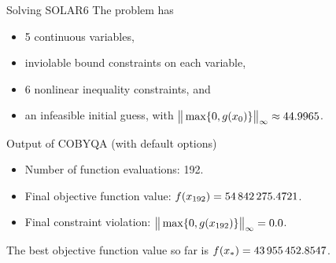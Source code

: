 \documentclass[
]{talk}
\newcommand*{\cub}{g}
\newcommand*{\iter}[1][]{x\ifblank{#1}{}{_{#1}}}
\newcommand*{\obj}{f}
\begin{document}
\begin{frame}{Solving SOLAR6 \parencite{Garneau_2015}}
    The problem has
    \begin{itemize}
        \item 5 continuous variables,
        \item \alert{inviolable} bound constraints on each variable,
        \item 6 nonlinear inequality constraints, and
        \item an \alert{infeasible} initial guess, with $\norm[\big]{\max \set{0, \cub(\iter[0])}}_{\infty} \approx \num{44.9965}$.
    \end{itemize}

    \medskip

    \begin{block}{Output of COBYQA (with default options)}
        \begin{itemize}
            \item Number of function evaluations: \num{192}.
            \item Final objective function value: $\obj(\iter[\num{192}]) = \num{54842275.4721}$.
            \item Final constraint violation: $\norm[\big]{\max \set{0, \cub(\iter[\num{192}])}}_{\infty} = 0.0$.
        \end{itemize}
    \end{block}

    \medskip

    The best objective function value \alert{so far} is $\obj(\iter[\ast]) = \num{43955452.8547}$.
\end{frame}
\end{document}
